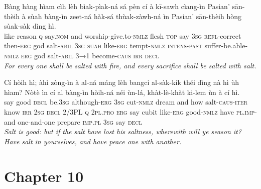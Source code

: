 \documentclass[11pt,a4paper]{article}
\begin{document}
\begin{exe}
\gll Bàng hàng hìam cìh lèh bìak-pìak-ná sá pèn cí à kī-sawh cìang-ìn Pasian' sān-thèih à sùah bàng-ìn zeet-ná hàk-sá thùak-zàwh-ná ìn Pasian' sān-thèih hòng sùak-sàk dìng hì. \\
     like reason \textsc{q} say.\textsc{nom} and worship-give.to-\textsc{nmlz} flesh \textsc{top} say \textsc{3sg} \textsc{refl}-correct then-\textsc{erg} god salt-\textsc{abil} \textsc{3sg} \textsc{suah} like-\textsc{erg} tempt-\textsc{nmlz} \textsc{intens}-\textsc{past} suffer-be.able-\textsc{nmlz} \textsc{erg} god salt-\textsc{abil} \textsc{3→1} become-\textsc{caus} \textsc{irr} \textsc{decl} \\
\glt \textcolor{kjvcolor}{\textit{For every one shall be salted with fire, and every sacrifice shall be salted with salt.}}

\gll Cí hòih hì; àhì zòng-ìn à al-ná máng lèh bangci al-sàk-kík théi dìng nà hì ùh hìam? Nòtè ìn cí al bàng-ìn hòih-ná néi ùn-lá, khàt-lè-khàt ki-lem ùn à cí hì. \\
     say good \textsc{decl} be.\textsc{3sg} although-\textsc{erg} \textsc{3sg} cut-\textsc{nmlz} dream and how salt-\textsc{caus}-\textsc{iter} know \textsc{irr} \textsc{2sg} \textsc{decl} 2/3PL \textsc{q} \textsc{2pl}.\textsc{pro} \textsc{erg} say cubit like-\textsc{erg} good-\textsc{nmlz} have \textsc{pl}.\textsc{imp}-and one-and-one prepare \textsc{imp}.\textsc{pl} \textsc{3sg} say \textsc{decl} \\
\glt \textcolor{kjvcolor}{\textit{Salt is good: but if the salt have lost his saltness, wherewith will ye season it? Have salt in yourselves, and have peace one with another.}}

\end{exe}
\newpage

\section*{Chapter 10}
\end{document}
